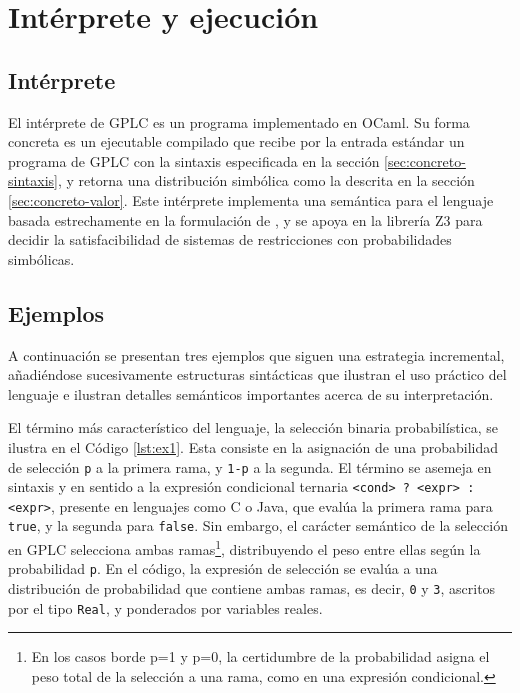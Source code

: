 \section{Intérprete y ejecución}

\subsection{Intérprete} El intérprete de GPLC es un programa
implementado en OCaml. Su forma concreta es un ejecutable
compilado que recibe por la entrada estándar un programa de GPLC con
la sintaxis especificada en la sección \ref{sec:concreto-sintaxis}, y
retorna una distribución simbólica como la descrita en la sección
\ref{sec:concreto-valor}. Este intérprete implementa una semántica
para el lenguaje basada estrechamente en la formulación de \cite{gplc}, y se
apoya en la librería Z3 para decidir la satisfacibilidad de sistemas de
restricciones con probabilidades simbólicas.


\subsection{Ejemplos} A continuación se presentan tres ejemplos que
siguen una estrategia incremental, añadiéndose
sucesivamente estructuras sintácticas que ilustran el
uso práctico del lenguaje e ilustran detalles semánticos
importantes acerca de su interpretación.

El término más característico del lenguaje, la selección binaria
probabilística, se ilustra en el Código \ref{lst:ex1}. Esta
consiste en la asignación de una probabilidad de selección
\lstinline|p| a la primera rama, y \lstinline|1-p| a la segunda. El
término se asemeja en sintaxis y en sentido a la expresión condicional
ternaria \verb|<cond> ? <expr> : <expr>|, presente en lenguajes como C
o Java, que evalúa la primera rama para \verb|true|, y la segunda para
\verb|false|. Sin embargo, el carácter semántico de la selección en
GPLC selecciona ambas ramas\footnote{En los casos borde p=1 y p=0,
  la certidumbre de la probabilidad asigna el peso total de la
  selección a una rama, como en una expresión condicional.}, 
distribuyendo el peso entre ellas según la probabilidad \verb|p|.  En
el código, la expresión de selección se evalúa a una distribución de
probabilidad que contiene ambas ramas, es decir, \lstinline|0| y
\lstinline|3|, ascritos por el tipo \lstinline|Real|, y ponderados por variables reales.




